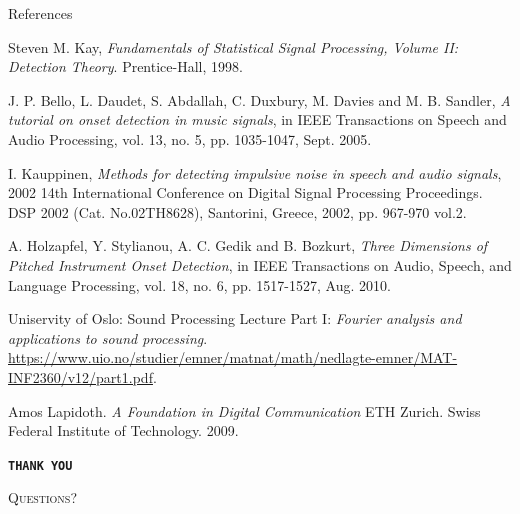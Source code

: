 \documentclass[10pt]{beamer}
\begin{document}
\appendix

\begin{frame}[allowframebreaks]{References}
\begin{thebibliography}{9}
Steven M. Kay, \textit{Fundamentals of Statistical Signal Processing, Volume II: Detection Theory}. Prentice-Hall, 1998.

J. P. Bello, L. Daudet, S. Abdallah, C. Duxbury, M. Davies and M. B. Sandler, \textit{A tutorial on onset detection in music signals}, in IEEE Transactions on Speech and Audio Processing, vol. 13, no. 5, pp. 1035-1047, Sept. 2005.

I. Kauppinen, \textit{Methods for detecting impulsive noise in speech and audio signals}, 2002 14th International Conference on Digital Signal Processing Proceedings. DSP 2002 (Cat. No.02TH8628), Santorini, Greece, 2002, pp. 967-970 vol.2.

A. Holzapfel, Y. Stylianou, A. C. Gedik and B. Bozkurt, \textit{Three Dimensions of Pitched Instrument Onset Detection}, in IEEE Transactions on Audio, Speech, and Language Processing, vol. 18, no. 6, pp. 1517-1527, Aug. 2010.

Uniservity of Oslo: Sound Processing Lecture Part I: \textit{Fourier analysis and applications to sound processing}. \url{https://www.uio.no/studier/emner/matnat/math/nedlagte-emner/MAT-INF2360/v12/part1.pdf}.

Amos Lapidoth. \textit{A Foundation in Digital Communication} ETH Zurich. Swiss Federal Institute of Technology. 2009.
\end{thebibliography}

\end{frame}


{
\begin{frame}
  \centering
  \Huge{\texttt{\textbf{THANK YOU}}}
\end{frame}
}


{
\begin{frame}[standout]
  \Huge
  \textsc{Questions?}
\end{frame}
}
\end{document}
